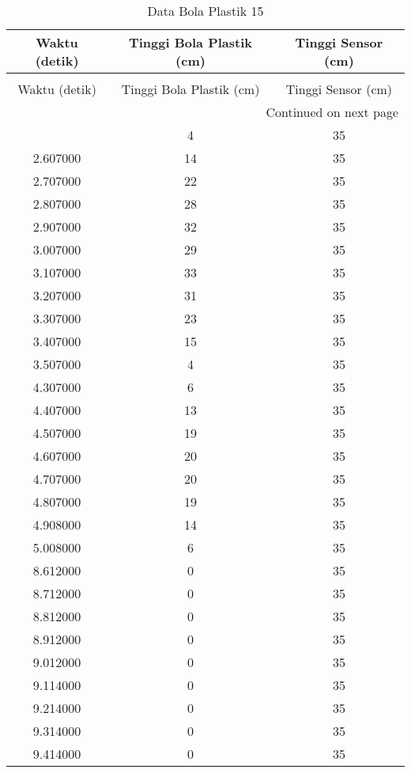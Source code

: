\begin{longtable}[htbp]{|c|c|c|}
\caption{Data Bola Plastik 15} \\
\hline
Waktu (detik) & Tinggi Bola Plastik (cm) & Tinggi Sensor (cm) \\ \hline
\endfirsthead
\caption[]{Data Bola Plastik 15} \\
\hline
Waktu (detik) & Tinggi Bola Plastik (cm) & Tinggi Sensor (cm) \\ \hline
\endhead
\multicolumn{3}{r}{Continued on next page} \\
\endfoot
\endlastfoot
2.507000 & 4 & 35 \\ \hline
2.607000 & 14 & 35 \\ \hline
2.707000 & 22 & 35 \\ \hline
2.807000 & 28 & 35 \\ \hline
2.907000 & 32 & 35 \\ \hline
3.007000 & 29 & 35 \\ \hline
3.107000 & 33 & 35 \\ \hline
3.207000 & 31 & 35 \\ \hline
3.307000 & 23 & 35 \\ \hline
3.407000 & 15 & 35 \\ \hline
3.507000 & 4 & 35 \\ \hline
4.307000 & 6 & 35 \\ \hline
4.407000 & 13 & 35 \\ \hline
4.507000 & 19 & 35 \\ \hline
4.607000 & 20 & 35 \\ \hline
4.707000 & 20 & 35 \\ \hline
4.807000 & 19 & 35 \\ \hline
4.908000 & 14 & 35 \\ \hline
5.008000 & 6 & 35 \\ \hline
8.612000 & 0 & 35 \\ \hline
8.712000 & 0 & 35 \\ \hline
8.812000 & 0 & 35 \\ \hline
8.912000 & 0 & 35 \\ \hline
9.012000 & 0 & 35 \\ \hline
9.114000 & 0 & 35 \\ \hline
9.214000 & 0 & 35 \\ \hline
9.314000 & 0 & 35 \\ \hline
9.414000 & 0 & 35 \\ \hline
\end{longtable}
